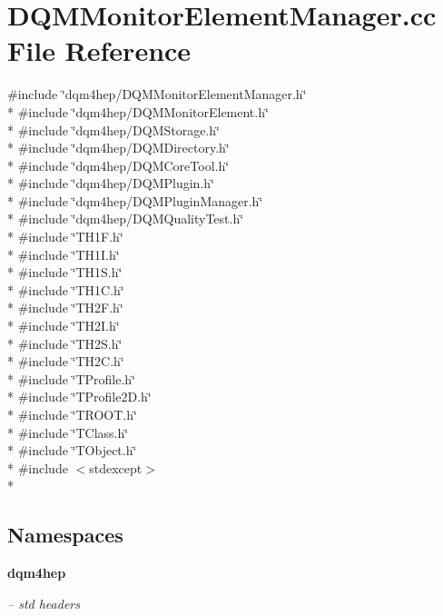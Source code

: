 \section{D\+Q\+M\+Monitor\+Element\+Manager.\+cc File Reference}
\label{DQMMonitorElementManager_8cc}
{\ttfamily \#include \char`\"{}dqm4hep/\+D\+Q\+M\+Monitor\+Element\+Manager.\+h\char`\"{}}\\*
{\ttfamily \#include \char`\"{}dqm4hep/\+D\+Q\+M\+Monitor\+Element.\+h\char`\"{}}\\*
{\ttfamily \#include \char`\"{}dqm4hep/\+D\+Q\+M\+Storage.\+h\char`\"{}}\\*
{\ttfamily \#include \char`\"{}dqm4hep/\+D\+Q\+M\+Directory.\+h\char`\"{}}\\*
{\ttfamily \#include \char`\"{}dqm4hep/\+D\+Q\+M\+Core\+Tool.\+h\char`\"{}}\\*
{\ttfamily \#include \char`\"{}dqm4hep/\+D\+Q\+M\+Plugin.\+h\char`\"{}}\\*
{\ttfamily \#include \char`\"{}dqm4hep/\+D\+Q\+M\+Plugin\+Manager.\+h\char`\"{}}\\*
{\ttfamily \#include \char`\"{}dqm4hep/\+D\+Q\+M\+Quality\+Test.\+h\char`\"{}}\\*
{\ttfamily \#include \char`\"{}T\+H1\+F.\+h\char`\"{}}\\*
{\ttfamily \#include \char`\"{}T\+H1\+I.\+h\char`\"{}}\\*
{\ttfamily \#include \char`\"{}T\+H1\+S.\+h\char`\"{}}\\*
{\ttfamily \#include \char`\"{}T\+H1\+C.\+h\char`\"{}}\\*
{\ttfamily \#include \char`\"{}T\+H2\+F.\+h\char`\"{}}\\*
{\ttfamily \#include \char`\"{}T\+H2\+I.\+h\char`\"{}}\\*
{\ttfamily \#include \char`\"{}T\+H2\+S.\+h\char`\"{}}\\*
{\ttfamily \#include \char`\"{}T\+H2\+C.\+h\char`\"{}}\\*
{\ttfamily \#include \char`\"{}T\+Profile.\+h\char`\"{}}\\*
{\ttfamily \#include \char`\"{}T\+Profile2\+D.\+h\char`\"{}}\\*
{\ttfamily \#include \char`\"{}T\+R\+O\+O\+T.\+h\char`\"{}}\\*
{\ttfamily \#include \char`\"{}T\+Class.\+h\char`\"{}}\\*
{\ttfamily \#include \char`\"{}T\+Object.\+h\char`\"{}}\\*
{\ttfamily \#include $<$stdexcept$>$}\\*
\subsection*{Namespaces}
\begin{DoxyCompactItemize}
\item 
 {\bf dqm4hep}
\begin{DoxyCompactList}\small\item\em -- std headers \end{DoxyCompactList}\end{DoxyCompactItemize}
